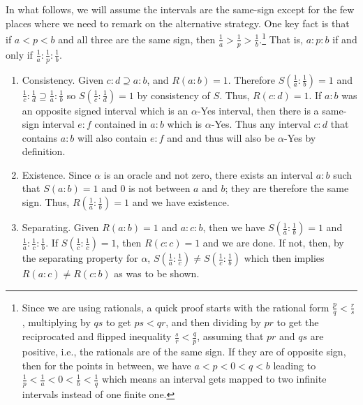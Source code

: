 \documentclass[12pt]{article}
\begin{document}
\begin{itemize}
    In what follows, we will assume the intervals are the same-sign except for the few places where we need to remark on the alternative strategy. One key fact is that if $a<p<b$ and all three are the same sign, then $\frac{1}{a} > \frac{1}{p} > \frac{1}{b}$.\footnote{Since we are using rationals, a quick proof starts with the rational form $\frac{p}{q} < \frac{r}{s}$, multiplying by $qs$ to get $ps < qr$, and then dividing by $pr$ to get the reciprocated and flipped inequality $\frac{s}{r} < \frac{q}{p}$, assuming that $pr$ and $qs$ are positive, i.e., the rationals are of the same sign. If they are of opposite sign, then for the points in between, we have $a < p < 0< q< b$ leading to $\frac{1}{p} < \frac{1}{a} < 0 < \frac{1}{b} < \frac{1}{q}$ which means an interval gets mapped to two infinite intervals instead of one finite one.} That is, $a:p:b$ if and only if $\frac{1}{a}:\frac{1}{p}:\frac{1}{b}$.
    
    \begin{enumerate}
        \item Consistency. Given $c:d \supseteq a:b$, and $R(a:b)=1$. Therefore $S(\frac{1}{a}:\frac{1}{b}) = 1$ and $\frac{1}{c}:\frac{1}{d} \supseteq \frac{1}{a}:\frac{1}{b}$ so $S(\frac{1}{c}:\frac{1}{d})=1$ by consistency of $S$. Thus, $R(c:d) = 1$. If $a:b$ was an opposite signed interval which is an $\alpha$-Yes interval, then there is a same-sign interval $e:f$ contained in $a:b$ which is $\alpha$-Yes. Thus any interval $c:d$ that contains $a:b$ will also contain $e:f$ and and thus will also be $\alpha$-Yes by definition. 
        \item Existence. Since $\alpha$ is an oracle and not zero, there exists an interval $a:b$ such that $S(a:b)=1$ and 0 is not between $a$ and $b$; they are therefore the same sign. Thus, $R(\frac{1}{a}:\frac{1}{b})=1$ and we have existence. 
        \item Separating. Given $R(a:b)=1$ and $a:c:b$, then we have $S(\frac{1}{a}:\frac{1}{b})=1$ and $\frac{1}{a}:\frac{1}{c}:\frac{1}{b}$. If $S(\frac{1}{c}:\frac{1}{c})=1$, then $R(c:c)=1$ and we are done. If not, then, by the separating property for $\alpha$,  $S(\frac{1}{a}:\frac{1}{c}) \neq S(\frac{1}{c}:\frac{1}{b})$ which then implies $R(a:c)\neq R(c:b)$ as was to be shown. 
        

\end{enumerate}
\end{itemize}
\end{document}

